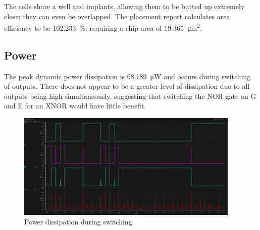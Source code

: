 The cells share a well and implants, allowing them to be butted up extremely close; they can even 
be overlapped. The placement report
calculates area efficiency to be \qty{102.233}{\percent}, requiring a chip area of \qty{19.365}{\um\squared}.

\subsection{Power}
The peak dynamic power dissipation is \qty{68.189}{\uW} and occurs during switching of outputs. 
There does not appear to be a greater level of dissipation due to all outputs being high simultaneously,
suggesting that switching the NOR gate on G and E for an XNOR would have little benefit. 
\begin{figure}[H]
    \centering
    \includegraphics[width=0.95\textwidth]{./figures/comparator/pwr-outputs.png}
    \caption{Power dissipation during switching}\label{fig:comparatorpower}
\end{figure}

